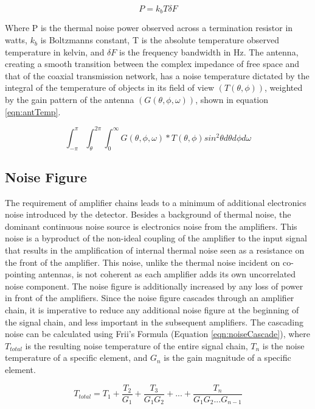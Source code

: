 \begin{equation}
	\label{eqn:NyquistNoise}
	P = k_{b}T\delta F
\end{equation}

Where P is the thermal noise power observed across a termination resistor in watts, $k_{b}$ is Boltzmanns constant, T is the absolute temperature observed temperature in kelvin, and $\delta F$ is the frequency bandwidth in Hz.  The antenna, creating a smooth transition between the complex impedance of free space and that of the coaxial transmission network, has a noise temperature dictated by the integral of the temperature of objects in its field of view $(T(\theta,\phi))$, weighted by the gain pattern of the antenna $(G(\theta,\phi,\omega))$, shown in equation \ref{eqn:antTemp}.

\begin{equation}
	\label{eqn:antTemp}
	\int_{-\pi}^{\pi}\int_{\theta}^{2\pi}\int_{0}^{\infty} G(\theta,\phi,\omega)*T(\theta,\phi)sin^{2}\theta d\theta d\phi d\omega
\end{equation}


	\subsection{Noise Figure} 
	The requirement of amplifier chains leads to a minimum of additional electronics noise introduced by the detector.  Besides a background of thermal noise, the dominant continuous noise source is electronics noise from the amplifiers.  This noise is a byproduct of the non-ideal coupling of the amplifier to the input signal that results in the amplification of internal thermal noise seen as a resistance on the front of the amplifier.   This noise, unlike the thermal noise incident on co-pointing antennas, is not coherent as each amplifier adds its own uncorrelated noise component.  The noise figure is additionally increased by any loss of power in front of the amplifiers.  Since the noise figure cascades through an amplifier chain, it is imperative to reduce any additional noise figure at the beginning of the signal chain, and less important in the subsequent amplifiers.  The cascading noise can be calculated using Frii's Formula (Equation \ref{eqn:noiseCascade}), where $T_{total}$ is the resulting noise temperature of the entire signal chain, $T_{n}$ is the noise temperature of a specific element, and $G_{n}$ is the gain magnitude of a specific element.
	
\begin{equation}
	\label{eqn:noiseCascade}
	T_{total} = T_{1} + \frac{T_{2}}{G_{1}} + \frac{T_{3}}{G_{1}G_{2}} + ... + \frac{T_{n}}{G_{1}G_{2}...G_{n-1}}
\end{equation}
	
